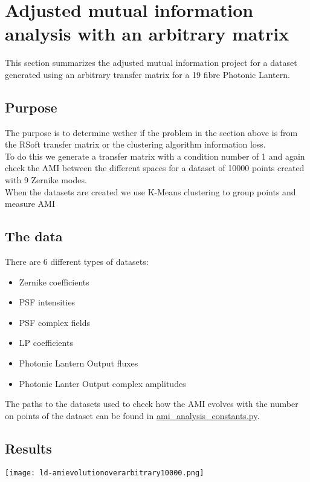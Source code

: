 \section{Adjusted mutual information analysis with an arbitrary matrix}
	This section summarizes the adjusted mutual information project for a dataset generated using an arbitrary transfer matrix for a 19 fibre Photonic Lantern.
	
	
	\subsection{Purpose}
	
		The purpose is to determine wether if the problem in the section above is from the RSoft transfer matrix or the clustering algorithm information loss.\\
		
		To do this we generate a transfer matrix with a condition number of 1 and again check the AMI between the different spaces for a dataset of 10000 points created with 9 Zernike modes.\\
		
		When the datasets are created we use K-Means clustering to group points and measure AMI\\
		
		
	\subsection{The data}
		There are 6 different types of datasets:
		\begin{itemize}
			\item Zernike coefficients
			\item PSF intensities
			\item PSF complex fields
			\item LP coefficients
			\item Photonic Lantern Output fluxes
			\item Photonic Lanter Output complex amplitudes
		\end{itemize}
		
		The paths to the datasets used to check how the AMI evolves with the number on points of the dataset can be found in \href{https://github.com/Dacarpe03/PLImageReconstruction/blob/main/Utils/ami_analysis_constants.py}{ami\_analysis\_constants.py}.
		
	
	\subsection{Results}
		\begin{figure*}[ht!]
			\centering
			\texttt{[image: ld-amievolutionoverarbitrary10000.png]}
		\end{figure*}
		\FloatBarrier
		
